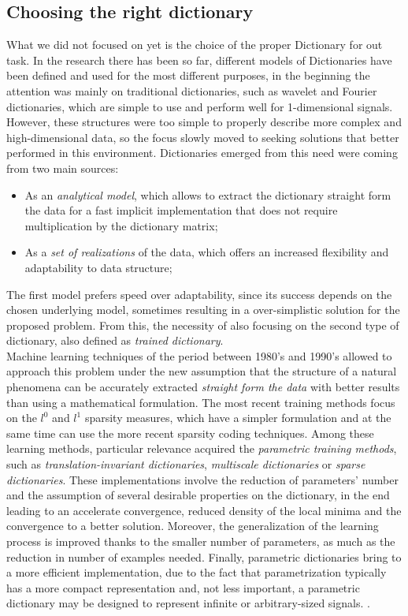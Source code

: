 \subsection{Choosing the right dictionary}
 What we did not focused on yet is the choice of the proper Dictionary for out task. In the research there has been so far, different models of Dictionaries have been defined and used for the most different purposes, in the beginning the attention was mainly on traditional dictionaries, such as wavelet and Fourier dictionaries, which are simple to use and perform well for 1-dimensional signals. However, these structures were too simple to properly describe more complex and high-dimensional data, so the focus slowly moved to seeking solutions that better performed in this environment. Dictionaries emerged from this need were coming from two main sources:
 \begin{itemize}
 \item As an \textit{analytical model}, which allows to extract the dictionary straight form the data for a fast implicit implementation that does not require multiplication by the dictionary matrix;
 \item As a \textit{set of realizations} of the data, which offers an increased flexibility and adaptability to data structure;
\end{itemize}
The first model prefers speed over adaptability, since its success depends on the chosen underlying model, sometimes resulting in a over-simplistic solution for the proposed problem. From this, the necessity of also focusing on the second type of dictionary, also defined as \textit{trained dictionary}.\\
Machine learning techniques of the period between 1980's and 1990's allowed to approach this problem under the new assumption that the structure of a natural phenomena can be accurately extracted \textit{straight form the data} with better results than using a mathematical formulation. The most recent training methods focus on the $l^0$ and $l^1$ sparsity measures, which have a simpler formulation and at the same time can use the more recent sparsity coding techniques. \cite{Gorodnitsky1997} \cite{Pati1993}
Among these learning methods, particular relevance acquired the \textit{parametric training methods}, such as \textit{translation-invariant dictionaries}, \textit{multiscale dictionaries} or \textit{sparse dictionaries}. These implementations involve the reduction of parameters' number and the assumption of several desirable properties on the dictionary, in the end leading to an accelerate convergence, reduced density of the local minima and the convergence to a better solution. Moreover, the generalization of the learning process is improved thanks to the smaller number of parameters, as much as the reduction in number of examples needed. Finally, parametric dictionaries bring to a more efficient implementation, due to the fact that parametrization typically has a more compact representation and, not less important, a parametric dictionary may be designed to represent infinite or arbitrary-sized signals. \cite{Rubinstein2010} .
